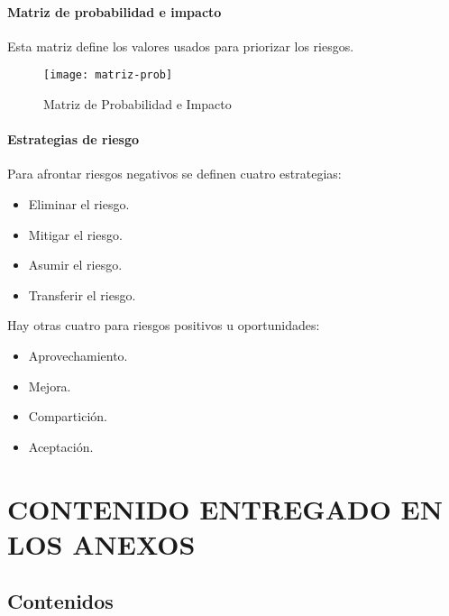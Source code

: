 \paragraph*{Matriz de probabilidad e impacto}
Esta matriz define los valores usados para priorizar los riesgos.
\begin{figure}[H]
\centering
\centerline{\texttt{[image: matriz-prob]}}
\caption{Matriz de Probabilidad e Impacto}
\end{figure}

\paragraph*{Estrategias de riesgo}
Para afrontar riesgos negativos se definen cuatro estrategias:
\begin{itemize}
\item Eliminar el riesgo.
\item Mitigar el riesgo.
\item Asumir el riesgo.
\item Transferir el riesgo.
\end{itemize}
Hay otras cuatro para riesgos positivos u oportunidades:
\begin{itemize}
\item Aprovechamiento.
\item Mejora.
\item Compartición.
\item Aceptación.
\end{itemize}


\newpage
\section{CONTENIDO ENTREGADO EN LOS ANEXOS}\label{sec:contenido_anexos}

\subsection{Contenidos} 


